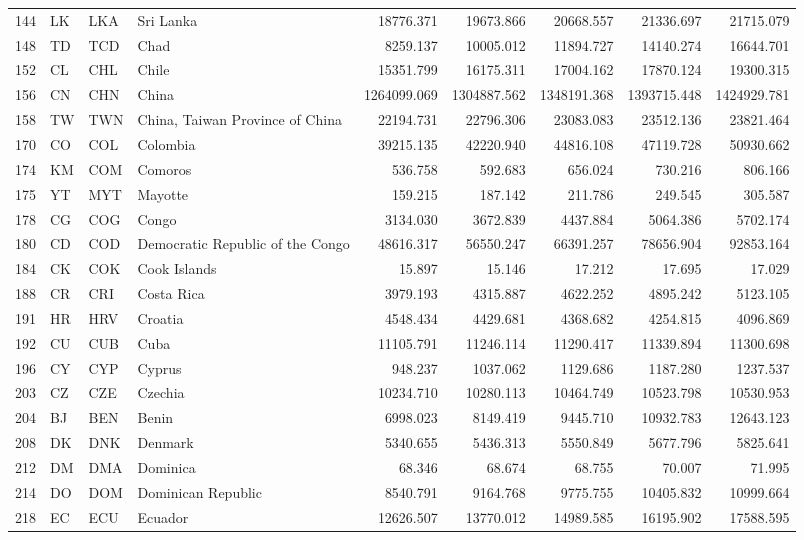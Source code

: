 {\begin{longtable}{rlllrrrrr}
 144 & LK & LKA & Sri Lanka & 18776.371 & 19673.866 & 20668.557 & 21336.697 & 21715.079 \\
 148 & TD & TCD & Chad & 8259.137 & 10005.012 & 11894.727 & 14140.274 & 16644.701 \\
 152 & CL & CHL & Chile & 15351.799 & 16175.311 & 17004.162 & 17870.124 & 19300.315 \\
 156 & CN & CHN & China & 1264099.069 & 1304887.562 & 1348191.368 & 1393715.448 & 1424929.781 \\
 158 & TW & TWN & China, Taiwan Province of China & 22194.731 & 22796.306 & 23083.083 & 23512.136 & 23821.464 \\
 170 & CO & COL & Colombia & 39215.135 & 42220.940 & 44816.108 & 47119.728 & 50930.662 \\
 174 & KM & COM & Comoros & 536.758 & 592.683 & 656.024 & 730.216 & 806.166 \\
 175 & YT & MYT & Mayotte & 159.215 & 187.142 & 211.786 & 249.545 & 305.587 \\
 178 & CG & COG & Congo & 3134.030 & 3672.839 & 4437.884 & 5064.386 & 5702.174 \\
 180 & CD & COD & Democratic Republic of the Congo & 48616.317 & 56550.247 & 66391.257 & 78656.904 & 92853.164 \\
 184 & CK & COK & Cook Islands & 15.897 & 15.146 & 17.212 & 17.695 & 17.029 \\
 188 & CR & CRI & Costa Rica & 3979.193 & 4315.887 & 4622.252 & 4895.242 & 5123.105 \\
 191 & HR & HRV & Croatia & 4548.434 & 4429.681 & 4368.682 & 4254.815 & 4096.869 \\
 192 & CU & CUB & Cuba & 11105.791 & 11246.114 & 11290.417 & 11339.894 & 11300.698 \\
 196 & CY & CYP & Cyprus & 948.237 & 1037.062 & 1129.686 & 1187.280 & 1237.537 \\
 203 & CZ & CZE & Czechia & 10234.710 & 10280.113 & 10464.749 & 10523.798 & 10530.953 \\
 204 & BJ & BEN & Benin & 6998.023 & 8149.419 & 9445.710 & 10932.783 & 12643.123 \\
 208 & DK & DNK & Denmark & 5340.655 & 5436.313 & 5550.849 & 5677.796 & 5825.641 \\
 212 & DM & DMA & Dominica & 68.346 & 68.674 & 68.755 & 70.007 & 71.995 \\
 214 & DO & DOM & Dominican Republic & 8540.791 & 9164.768 & 9775.755 & 10405.832 & 10999.664 \\
 218 & EC & ECU & Ecuador & 12626.507 & 13770.012 & 14989.585 & 16195.902 & 17588.595 \\

\end{longtable}}
